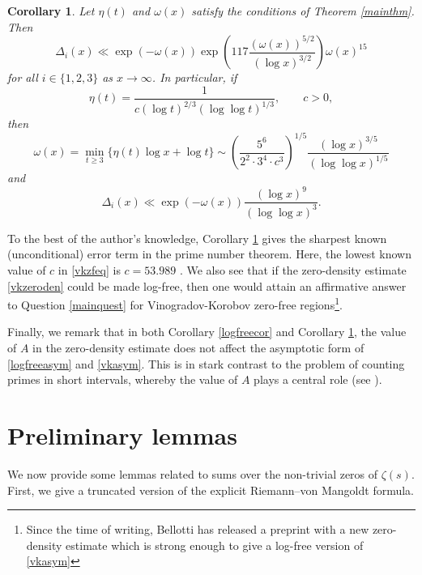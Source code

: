 \documentclass[reqno]{amsart}
\newtheorem{corollary}[theorem]{Corollary}
\numberwithin{equation}{section}
\theoremstyle{remark}
\begin{document}
\begin{corollary}\label{vkcor}
    Let $\eta(t)$ and $\omega(x)$ satisfy the conditions of Theorem \ref{mainthm}. Then
    \begin{equation*}
        \Delta_i(x)\ll\exp(-\omega(x))\exp\left(117\frac{(\omega(x))^{5/2}}{(\log x)^{3/2}}\right)\omega(x)^{15}
    \end{equation*}
    for all $i\in\{1,2,3\}$ as $x\to\infty$. In particular, if
    \begin{equation}\label{vkzfeq}
        \eta(t)=\frac{1}{c(\log t)^{2/3}(\log\log t)^{1/3}},\qquad c>0,
    \end{equation}
    then 
    \begin{equation*}
        \omega(x)=\min_{t\geq 3}\{\eta(t)\log x+\log t\}\sim \left(\frac{5^6}{2^2\cdot 3^4\cdot c^3}\right)^{1/5}\frac{(\log x)^{3/5}}{(\log\log x)^{1/5}}
    \end{equation*}
    and 
    \begin{equation}\label{vkasym}
        \Delta_i(x)\ll\exp(-\omega(x))\frac{(\log x)^9}{(\log\log x)^3}.
    \end{equation}
\end{corollary}
To the best of the author's knowledge, Corollary \ref{vkcor} gives the sharpest known (unconditional) error term in the prime number theorem. Here, the lowest known value of $c$ in \eqref{vkzfeq} is $c=53.989$ \cite[Theorem 1.2]{bellotti2024explicit}. We also see that if the zero-density estimate \eqref{vkzeroden} could be made log-free, then one would attain an affirmative answer to Question \ref{mainquest} for Vinogradov-Korobov zero-free regions\footnote{Since the time of writing, Bellotti \cite{bellotti2025new} has released a preprint with a new zero-density estimate which is strong enough to give a log-free version of \eqref{vkasym}}. 

Finally, we remark that in both Corollary \ref{logfreecor} and Corollary \ref{vkcor}, the value of $A$ in the zero-density estimate does not affect the asymptotic form of \eqref{logfreeasym} and \eqref{vkasym}. This is in stark contrast to the problem of counting primes in short intervals, whereby the value of $A$ plays a central role (see \cite{starichkova2025note}).


\section{Preliminary lemmas}
We now provide some lemmas related to sums over the non-trivial zeros of $\zeta(s)$. First, we give a truncated version of the explicit Riemann--von Mangoldt formula.
\end{document}
